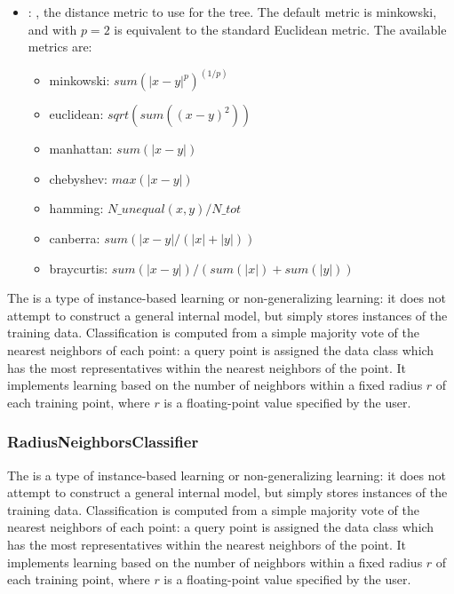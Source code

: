 \begin{itemize}
    \item {}: , 
      the distance metric to use for the tree. The default metric is minkowski, and with
      $p=2$ is equivalent to the standard Euclidean metric.
      The available metrics are:                                                  \begin{itemize}
      \item minkowski: $sum(|x - y|^p)^(1/p)$
      \item euclidean: $sqrt(sum((x - y)^2))$
      \item manhattan: $sum(|x - y|)$                                                    \item
      chebyshev: $max(|x - y|)$                                                    \item hamming:
      $N\_unequal(x, y) / N\_tot$                                                    \item canberra:
      $sum(|x - y| / (|x| + |y|))$                                                    \item
      braycurtis: $sum(|x - y|) / (sum(|x|) + sum(|y|))$
      \end{itemize}
  \end{itemize}
 The  is a type of instance-based learning or
 non-generalizing learning: it does not attempt to construct a general internal
 model, but simply stores instances of the training data.                          Classification is
 computed from a simple majority vote of the nearest neighbors                          of each
 point: a query point is assigned the data class which has the most
 representatives within the nearest neighbors of the point.                          It implements
 learning based on the number of neighbors within a fixed radius                          $r$ of
 each training point, where $r$ is a floating-point value specified by the
 user.                          

\subsubsection{RadiusNeighborsClassifier}
  The  is a type of instance-based learning or
  non-generalizing learning: it does not attempt to construct a general internal
  model, but simply stores instances of the training data.                          Classification
  is computed from a simple majority vote of the nearest neighbors                          of each
  point: a query point is assigned the data class which has the most
  representatives within the nearest neighbors of the point.                          It implements
  learning based on the number of neighbors within a fixed radius                          $r$ of
  each training point, where $r$ is a floating-point value specified by the
  user.                          

